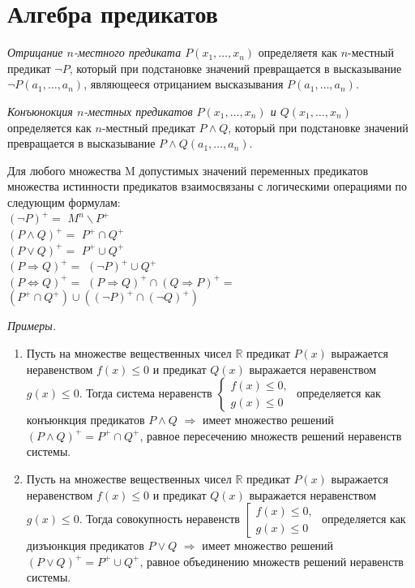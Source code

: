 \section{Алгебра предикатов}

{\it Отрицание $n$-местного предиката $P(x_1, \dots, x_n)$} определяетя как $n$-местный предикат $\neg P$, который при подстановке значений превращается в высказывание $\neg P(a_1, \dots, a_n)$, являющееся отрицанием высказывания $P(a_1, \dots, a_n)$.

{\it Конъюнокция $n$-местных предикатов $P(x_1, \dots, x_n)$ и $Q(x_1, \dots, x_n)$} определяется как $n$-местный предикат $P \land Q$, который при подстановке значений превращается в высказывание $P\land Q(a_1, \dots, a_n)$.

Для любого множества M допустимых значений переменных предикатов множества истинности предикатов взаимосвязаны с логическими операциями по следующим формулам: \\
$(\neg P)^+ =$ $M^n \backslash P^+$ \\
$(P \land Q)^+ =$ $P^+ \cap Q^+$ \\
$(P \lor Q)^+ =$ $P^+ \cup Q^+$ \\
$(P \Rightarrow Q)^+ =$ $(\neg P)^+ \cup Q^+$ \\
$(P \Leftrightarrow Q)^+ =$ $(P \Rightarrow Q)^+ \cap (Q \Rightarrow P)^+ =$ $(P^+ \cap Q^+) \cup ((\neg P)^+ \cap (\lnot Q)^+)$

{\it Примеры.}
\begin{enumerate}
    \item Пусть на множестве вещественных чисел $\mathbb R$ предикат $P(x)$ выражается неравенством $f(x) \leq 0$ и предикат $Q(x)$ выражается неравенством $g(x) \leq 0$. Тогда система неравенств $\begin{cases} f(x) \leq 0, \\ g(x) \leq 0 \end{cases}$ определяется как конъюнкция предикатов $P \land Q$ $\Rightarrow$ имеет множество решений $(P \land Q)^+ = P^+ \cap Q^+$, равное пересечению множеств решений неравенств системы.
    \item Пусть на множестве вещественных чисел $\mathbb R$ предикат $P(x)$ выражается неравенством $f(x) \leq 0$ и предикат $Q(x)$ выражается неравенством $g(x) \leq 0$. Тогда совокупность неравенств $\left[ \begin{gathered} f(x) \leq 0, \\ g(x) \leq 0 \end{gathered} \right.$ определяется как дизъюнкция предикатов $P \lor Q$ $\Rightarrow$ имеет множество решений $(P \lor Q)^+ = P^+ \cup Q^+$, равное объединению множеств решений неравенств системы.
\end{enumerate}


